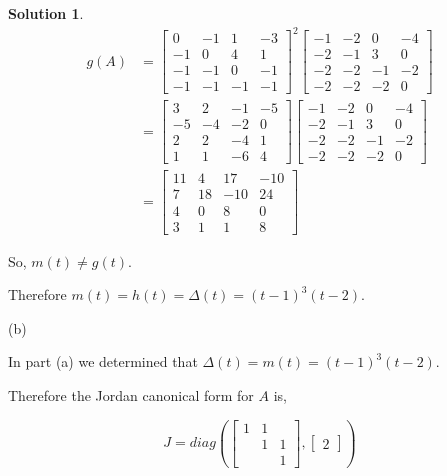 \documentclass{article}
\theoremstyle{definition}
\newtheorem*{solution}{Solution}
\theoremstyle{remark}
\begin{document}
\begin{solution}
\begin{align*}
g(A) & = 
\begin{bmatrix}
0 & -1 & 1 & -3 \\
-1 & 0 & 4 & 1 \\
-1 & -1 & 0 & -1 \\
-1 & -1 & -1 & -1
\end{bmatrix}^2
\begin{bmatrix}
-1 & -2 & 0 & -4 \\
-2 & -1 & 3 & 0 \\
-2 & -2 & -1 & -2 \\
-2 & -2 & -2 & 0
\end{bmatrix} \\
& =
\begin{bmatrix}
3 & 2 & -1 & -5 \\
-5 & -4 & -2 & 0 \\
2 & 2 & -4 & 1 \\
1 & 1 & -6 & 4
\end{bmatrix}
\begin{bmatrix}
-1 & -2 & 0 & -4 \\
-2 & -1 & 3 & 0 \\
-2 & -2 & -1 & -2 \\
-2 & -2 & -2 & 0
\end{bmatrix} \\
& =
\begin{bmatrix}
11 & 4 & 17 & -10 \\
7 & 18 & -10 & 24 \\
4 & 0 & 8 & 0 \\
3 & 1 & 1 & 8
\end{bmatrix}
\end{align*}

So, $m(t)\neq g(t)$.

Therefore $m(t)=h(t)=\Delta (t)=(t-1)^3(t-2)$.

(b)

In part (a) we determined that $\Delta (t)=m(t)=(t-1)^3(t-2)$.

Therefore the Jordan canonical form for $A$ is,

\[J=diag\left(
\begin{bmatrix}
1 & 1 & \\
 & 1 & 1 \\
 & & 1
\end{bmatrix},
\begin{bmatrix}
2
\end{bmatrix}
\right)\]

\end{solution}
\end{document}
